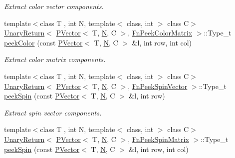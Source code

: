 \begin{DoxyCompactItemize}
\begin{DoxyCompactList}\small\item\em Extract color vector components. \end{DoxyCompactList}\item 
{\footnotesize template$<$class T , int N, template$<$ class, int $>$ class C$>$ }\\\mbox{\hyperlink{structENSEM_1_1UnaryReturn}{Unary\+Return}}$<$ \mbox{\hyperlink{classENSEM_1_1PVector}{P\+Vector}}$<$ T, \mbox{\hyperlink{operator__name__util_8cc_a7722c8ecbb62d99aee7ce68b1752f337}{N}}, C $>$, \mbox{\hyperlink{structENSEM_1_1FnPeekColorMatrix}{Fn\+Peek\+Color\+Matrix}} $>$\+::Type\+\_\+t \mbox{\hyperlink{group__primvector_gaa5bcf955bf475e0717ffc91e91c154b9}{peek\+Color}} (const \mbox{\hyperlink{classENSEM_1_1PVector}{P\+Vector}}$<$ T, \mbox{\hyperlink{operator__name__util_8cc_a7722c8ecbb62d99aee7ce68b1752f337}{N}}, C $>$ \&l, int row, int col)
\begin{DoxyCompactList}\small\item\em Extract color matrix components. \end{DoxyCompactList}\item 
{\footnotesize template$<$class T , int N, template$<$ class, int $>$ class C$>$ }\\\mbox{\hyperlink{structENSEM_1_1UnaryReturn}{Unary\+Return}}$<$ \mbox{\hyperlink{classENSEM_1_1PVector}{P\+Vector}}$<$ T, \mbox{\hyperlink{operator__name__util_8cc_a7722c8ecbb62d99aee7ce68b1752f337}{N}}, C $>$, \mbox{\hyperlink{structENSEM_1_1FnPeekSpinVector}{Fn\+Peek\+Spin\+Vector}} $>$\+::Type\+\_\+t \mbox{\hyperlink{group__primvector_ga4da125100d39a8e268564ed66d48bae5}{peek\+Spin}} (const \mbox{\hyperlink{classENSEM_1_1PVector}{P\+Vector}}$<$ T, \mbox{\hyperlink{operator__name__util_8cc_a7722c8ecbb62d99aee7ce68b1752f337}{N}}, C $>$ \&l, int row)
\begin{DoxyCompactList}\small\item\em Extract spin vector components. \end{DoxyCompactList}\item 
{\footnotesize template$<$class T , int N, template$<$ class, int $>$ class C$>$ }\\\mbox{\hyperlink{structENSEM_1_1UnaryReturn}{Unary\+Return}}$<$ \mbox{\hyperlink{classENSEM_1_1PVector}{P\+Vector}}$<$ T, \mbox{\hyperlink{operator__name__util_8cc_a7722c8ecbb62d99aee7ce68b1752f337}{N}}, C $>$, \mbox{\hyperlink{structENSEM_1_1FnPeekSpinMatrix}{Fn\+Peek\+Spin\+Matrix}} $>$\+::Type\+\_\+t \mbox{\hyperlink{group__primvector_ga5461f8956839af7e7079b717601376a7}{peek\+Spin}} (const \mbox{\hyperlink{classENSEM_1_1PVector}{P\+Vector}}$<$ T, \mbox{\hyperlink{operator__name__util_8cc_a7722c8ecbb62d99aee7ce68b1752f337}{N}}, C $>$ \&l, int row, int col)

\end{DoxyCompactItemize}
